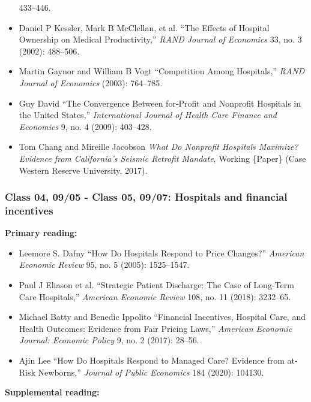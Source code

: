 \documentclass[11pt,]{article}
\providecommand{\tightlist}{%
  \setlength{\itemsep}{0pt}\setlength{\parskip}{0pt}}
\begin{document}
\begin{itemize}
  433--446.
\item
  Daniel P Kessler, Mark B McClellan, et al. {``The {Effects} of
  {Hospital} {Ownership} on {Medical} {Productivity},''} \emph{RAND
  Journal of Economics} 33, no. 3 (2002): 488--506.
\item
  Martin Gaynor and William B Vogt {``Competition Among {Hospitals},''}
  \emph{RAND Journal of Economics} (2003): 764--785.
\item
  Guy David {``The Convergence Between for-Profit and Nonprofit
  Hospitals in the {United} {States},''} \emph{International Journal of
  Health Care Finance and Economics} 9, no. 4 (2009): 403--428.
\item
  Tom Chang and Mireille Jacobson \emph{What Do {Nonprofit} {Hospitals}
  {Maximize}? {Evidence} from {California}'s {Seismic} {Retrofit}
  {Mandate}}, Working \{Paper\} (Case Western Reserve University, 2017).
\end{itemize}

\hypertarget{class-04-0905---class-05-0907-hospitals-and-financial-incentives}{%
\subsubsection{Class 04, 09/05 - Class 05, 09/07: Hospitals and
financial
incentives}\label{class-04-0905---class-05-0907-hospitals-and-financial-incentives}}

\textbf{Primary reading:}

\begin{itemize}
\tightlist
\item
  Leemore S. Dafny {``How {Do} {Hospitals} {Respond} to {Price}
  {Changes}?''} \emph{American Economic Review} 95, no. 5 (2005):
  1525--1547.
\item
  Paul J Eliason et al. {``Strategic Patient Discharge: {The} Case of
  Long-Term Care Hospitals,''} \emph{American Economic Review} 108, no.
  11 (2018): 3232--65.
\item
  Michael Batty and Benedic Ippolito {``Financial Incentives, Hospital
  Care, and Health Outcomes: {Evidence} from Fair Pricing Laws,''}
  \emph{American Economic Journal: Economic Policy} 9, no. 2 (2017):
  28--56.
\item
  Ajin Lee {``How Do Hospitals Respond to Managed Care? {Evidence} from
  at-Risk Newborns,''} \emph{Journal of Public Economics} 184 (2020):
  104130.
\end{itemize}

\textbf{Supplemental reading:}
\end{document}
